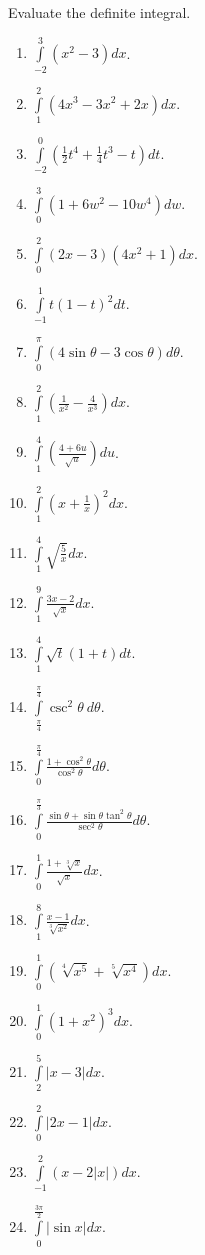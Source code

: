 \begin{problem}
Evaluate the definite integral.
\begin{multicols}{2}
\begin{enumerate}
\item $\displaystyle \int\limits_{-2}^{3} (x^2-3) dx$.
\item $\displaystyle \int\limits_{1}^{2} (4x^3-3x^2+2x) dx$.
\item $\displaystyle \int\limits_{-2}^{0} \left(\frac{1}{2}t^4+\frac{1}{4}t^3-t \right) dt$.
\item $\displaystyle \int\limits_{0}^{3}(1+6w^2-10w^4) dw$.
\item $\displaystyle \int\limits_{0}^{2}(2x-3)(4x^2+1) dx$.
\item $\displaystyle \int\limits_{-1}^{1} t(1-t)^2 dt$.
\item $\displaystyle \int\limits_{0}^{\pi} (4\sin \theta -3 \cos \theta)d\theta$.
\item $\displaystyle \int\limits_{1}^{2}\left(\frac{1}{x^2}-\frac{4}{x^3}\right) dx$.
\item $\displaystyle \int\limits_{1}^{4}\left(\frac{4+6u}{\sqrt{u}}\right) du$.
\item $\displaystyle \int\limits_{1}^{2}\left(x+\frac{1}{x}\right)^2 dx$.
\item $\displaystyle \int\limits_{1}^{4}\sqrt{\frac{5}{x}} dx$.
\item $\displaystyle \int\limits_{1}^{9}\frac{3x-2}{\sqrt{x}} dx$.
\item $\displaystyle \int\limits_{1}^{4}\sqrt{t}(1+t) dt$.
\item $\displaystyle \int\limits_{\frac{\pi}{4}}^{\frac{\pi}{4}} \csc^2\theta ~d\theta$.
\item $\displaystyle \int\limits_{0}^{\frac{\pi}{4}}\frac{1+\cos^2\theta}{\cos^2\theta} d\theta$.
\item $\displaystyle \int\limits_{0}^{\frac{\pi}{3}} \frac{\sin \theta +\sin \theta \tan^2\theta}{\sec^2\theta}d\theta$.
\item $\displaystyle \int\limits_{0}^1 \frac{1+\sqrt[3]{x}}{\sqrt{x}}dx$.
\item $\displaystyle \int\limits_{1}^{8}\frac{x-1}{\sqrt[3]{x^2}} dx$.
\item $\displaystyle \int\limits_0^{1} (\sqrt[4]{x^5}+\sqrt[5]{x^4})dx $.
\item $\displaystyle \int\limits_{0}^{1}(1+x^2)^3 dx$.
\item $\displaystyle \int\limits_{2}^{5}|x-3| dx$.
\item $\displaystyle \int\limits_{0}^{2} |2x-1| dx$.
\item $\displaystyle \int\limits_{-1}^{2}(x-2|x|) dx$.
\item $\displaystyle \int\limits_{0}^{\frac{3\pi}{2}}|\sin x| dx$.
\end{enumerate}
\end{multicols}
\end{problem}